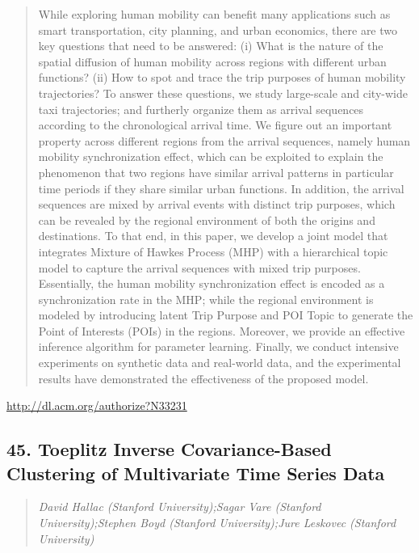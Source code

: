 \documentclass{article}
\begin{document}
\begin{quote}
While exploring human mobility can benefit many applications such as smart transportation, city planning, and urban economics, there are two key questions that need to be answered: (i) What is the nature of the spatial diffusion of human mobility across regions with different urban functions? (ii) How to spot and trace the trip purposes of human mobility trajectories? To answer these questions, we study large-scale and city-wide taxi trajectories; and furtherly organize them as arrival sequences according to the chronological arrival time. We figure out an important property across different regions from the arrival sequences, namely human mobility synchronization effect, which can be exploited to explain the phenomenon that two regions have similar arrival patterns in particular time periods if they share similar urban functions. In addition, the arrival sequences are mixed by arrival events with distinct trip purposes, which can be revealed by the regional environment of both the origins and destinations. To that end, in this paper, we develop a joint model that integrates Mixture of Hawkes Process (MHP) with a hierarchical topic model to capture the arrival sequences with mixed trip purposes. Essentially, the human mobility synchronization effect is encoded as a synchronization rate in the MHP; while the regional environment is modeled by introducing latent Trip Purpose and POI Topic to generate the Point of Interests (POIs) in the regions. Moreover, we provide an effective inference algorithm for parameter learning. Finally, we conduct intensive experiments on synthetic data and real-world data, and the experimental results have demonstrated the effectiveness of the proposed model.
\end{quote}

\href{http://dl.acm.org/authorize?N33231}{http://dl.acm.org/authorize?N33231}

\subsection{45. Toeplitz Inverse Covariance-Based Clustering of Multivariate Time Series Data}

\begin{quote}
\footnotesize{\textit{David Hallac (Stanford University);Sagar Vare (Stanford University);Stephen Boyd (Stanford University);Jure Leskovec (Stanford University)}}

\end{quote}
\end{document}
